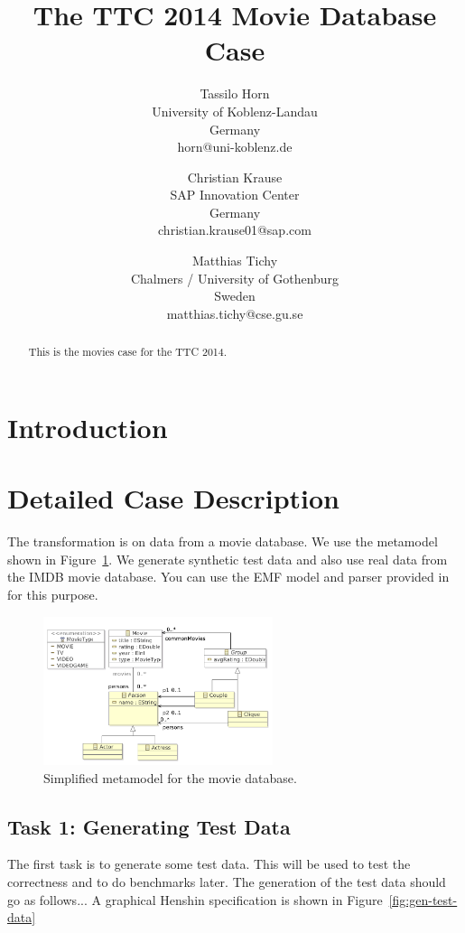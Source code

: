 \documentclass[a4paper]{article}
\title{The TTC 2014 Movie Database Case}
\author{
Tassilo Horn\\ University of Koblenz-Landau\\ Germany\\ horn@uni-koblenz.de
\and
Christian Krause\\ SAP Innovation Center\\ Germany\\ christian.krause01@sap.com
\and
Matthias Tichy\\ Chalmers / University of Gothenburg\\ Sweden\\ matthias.tichy@cse.gu.se
}
\begin{document}
\maketitle

\begin{abstract}
This is the movies case for the TTC 2014.
\end{abstract}
\vskip 32pt


\section{Introduction}


\section{Detailed Case Description}

The transformation is on data from a movie database.
We use the metamodel shown in Figure~\ref{fig:metamodel}.
We generate synthetic test data and also use real data
from the IMDB movie database. You can use the EMF model and
parser provided in \cite{IMDB2EMF} for this purpose.


\begin{figure}[ht]
\centering
\includegraphics[width=0.6\textwidth]{movies}
\caption{Simplified metamodel for the movie database.}
\label{fig:metamodel}
\end{figure}

\subsection{Task 1: Generating Test Data}
\label{sec:gen-test-data}

The first task is to generate some test data.
This will be used to test the correctness and to do benchmarks later.
The generation of the test data should go as follows...
A graphical Henshin specification is shown in Figure~\ref{fig:gen-test-data}
\end{document}
